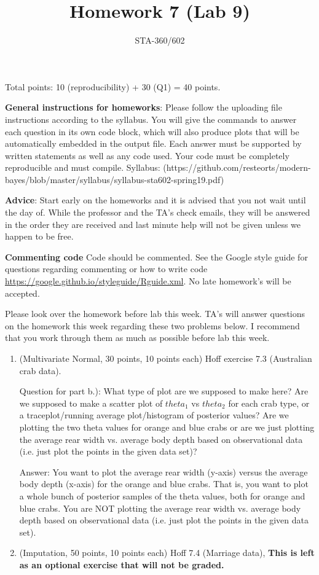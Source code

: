 \documentclass{article}
\begin{document}
\title{Homework 7 (Lab 9)}
\author{STA-360/602}
\date{}
\maketitle

Total points: 10 (reproducibility) + 30 (Q1) = 40 points. 

\textbf{General instructions for homeworks}: Please follow the uploading file instructions according to the syllabus. You will give the commands to answer each question in its own code block, which will also produce plots that will be automatically embedded in the output file. Each answer must be supported by written statements as well as any code used. Your code must be completely reproducible and must compile. Syllabus: (https://github.com/resteorts/modern-bayes/blob/master/syllabus/syllabus-sta602-spring19.pdf)

\textbf{Advice}: Start early on the homeworks and it is advised that you not wait until the day of. While the professor and the TA's check emails, they will be answered in the order they are received and last minute help will not be given unless we happen to be free.  

\textbf{Commenting code}
Code should be commented. See the Google style guide for questions regarding commenting or how to write 
code \url{https://google.github.io/styleguide/Rguide.xml}. No late homework's will be accepted.

Please look over the homework before lab this week. TA's will answer questions on the homework this week regarding these two 
problems below. I recommend that you work through them as much as possible before lab this week. 

\begin{enumerate}
\item (Multivariate Normal, 30 points, 10 points each) Hoff exercise 7.3 (Australian crab data).

Question for part b.): What type of plot are we supposed to make here? Are we supposed to make a scatter plot of $theta_1$ vs $theta_2$ for each crab type, or a traceplot/running average plot/histogram of posterior values? Are we plotting the two theta values for orange and blue crabs or are we just plotting the average rear width vs. average body depth based on observational data (i.e. just plot the points in the given data set)?

Answer: You want to plot the average rear width (y-axis) versus the average body depth (x-axis) for the orange and blue crabs. That is, you want to plot a whole bunch of posterior samples of the theta values, both for orange and blue crabs. You are NOT plotting the average rear width vs. average body depth based on observational data (i.e. just plot the points in the given data set). 

\item (Imputation, 50 points, 10 points each) Hoff 7.4 (Marriage data), \textbf{This is left as an optional exercise that will not be graded.}
\end{enumerate}
\end{document}
